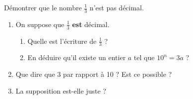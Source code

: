 
Démontrer que le nombre $\frac{1}{3}$ n'est pas décimal.

\begin{enumerate}
\item On suppose que  $\frac{1}{3}$ \textbf{est} décimal.
	\begin{enumerate}
	\item Quelle est l'écriture de $\frac{1}{3}$ ?
	\item En déduire qu'il existe un entier $a$ tel que $10^n = 3a$ ?
	\end{enumerate}
\item Que dire que 3 par rapport à 10 ? Est ce possible ?
\item La supposition est-elle juste ?
\end{enumerate}